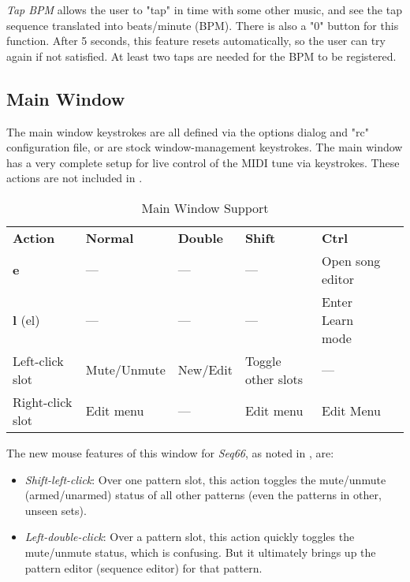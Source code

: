    \textsl{Tap BPM} allows the user to "tap" in time with some
   other music, and see the tap sequence translated into beats/minute (BPM).
   There is also a "0" button for this function.
   After 5 seconds, this feature resets automatically, so the user can try
   again if not satisfied.  At least two taps are needed for the
   BPM to be registered.

%

\subsection{Main Window}
\label{subsec:kbd_mouse_main_window}

   The main window keystrokes are all defined via the options dialog
   and "rc" configuration file, or are stock window-management keystrokes.
   The main window has a very complete setup for live control of the MIDI tune
   via keystrokes.  These actions are not included in
   .

   \begin{table}[H]
      \centering
      \caption{Main Window Support}
      \label{table:main_window_support}
      \begin{tabular}{l l l l l l}
         \textbf{Action} & \textbf{Normal} & \textbf{Double} & \textbf{Shift} & \textbf{Ctrl} \\
         \textbf{e} & --- & --- & --- & Open song editor \\
         \textbf{l} (el) & --- & --- & --- & Enter Learn mode \\
         Left-click slot & Mute/Unmute & New/Edit & Toggle other slots & --- \\
         Right-click slot & Edit menu & --- & Edit menu & Edit Menu \\
      \end{tabular}
   \end{table}

   The new mouse features of this window for \textsl{Seq66},
   as noted in , are:

   \begin{itemize}
      \item \textsl{Shift-left-click}:
         Over one pattern slot, this action toggles the mute/unmute
         (armed/unarmed) status of all other patterns
         (even the patterns in other, unseen sets).
      \item \textsl{Left-double-click}:
         Over a pattern slot, this action quickly toggles the mute/unmute status,
         which is confusing.  But it ultimately brings up the pattern editor
         (sequence editor) for that pattern.
   \end{itemize}

